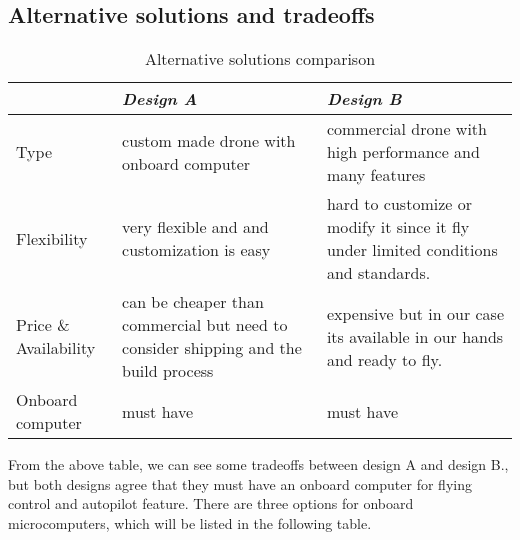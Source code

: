 \documentclass[../main.tex]{subfiles}
\begin{document}
\subsection{Alternative solutions and tradeoffs}
\begin{table}[hbt!]
	\begin{tabular}{ | p{4cm}| p{6cm} | p{6cm} |}
		\hline
		\textit{} & \textit{Design A} & \textit{Design B}\\ \hline
		Type  & custom made drone with onboard computer & commercial drone with high performance and many features    \\ \hline
		Flexibility & very flexible and and customization is easy & hard to customize or modify it since it fly under limited conditions and standards. \\ \hline
		
		Price \& Availability & can be cheaper than commercial but need to consider
		shipping and the build process & expensive but in our case its available in our hands and ready to fly.   \\ \hline
		
		Onboard computer & must have & must have \\ \hline
		
		
		
	\end{tabular}
	\caption{Alternative solutions comparison}
\end{table} \label{tab: Alternative solutions and tradeoffs comparison }
From the above table, we can see some tradeoffs between design A and design B., but both designs agree that they must have an onboard computer for flying control and autopilot feature. There are three options for onboard microcomputers, which will be listed in the following table.
\end{document}
